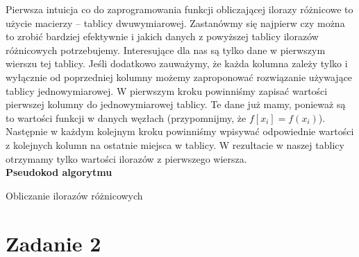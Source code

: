 \documentclass[]{article}
\begin{document}
	\noindent Pierwsza intuicja co do zaprogramowania funkcji obliczającej ilorazy różnicowe to użycie macierzy -- tablicy dwuwymiarowej. Zastanówmy się najpierw czy można to zrobić bardziej efektywnie i jakich danych z powyższej tablicy ilorazów różnicowych potrzebujemy. Interesujące dla nas są tylko dane w pierwszym wierszu tej tablicy. Jeśli dodatkowo zauważymy, że każda kolumna zależy tylko i wyłącznie od poprzedniej kolumny możemy zaproponować rozwiązanie używające tablicy jednowymiarowej. W pierwszym kroku powinniśmy zapisać wartości pierwszej kolumny do jednowymiarowej tablicy. Te dane już mamy, ponieważ są to wartości funkcji w danych węzłach (przypomnijmy, że $f[x_i] = f(x_i)$). Następnie w każdym kolejnym kroku powinniśmy wpisywać odpowiednie
	wartości z kolejnych kolumn na ostatnie miejsca w tablicy. W rezultacie w naszej tablicy otrzymamy tylko wartości ilorazów z pierwszego wiersza.\\
	\clearpage
	\noindent\textbf{Pseudokod algorytmu}\\
	\begin{algorithm}[h]
		\DontPrintSemicolon
		
		
		\caption{Obliczanie ilorazów różnicowych}
	\end{algorithm}
	
	\section*{Zadanie 2}
	
\end{document}
